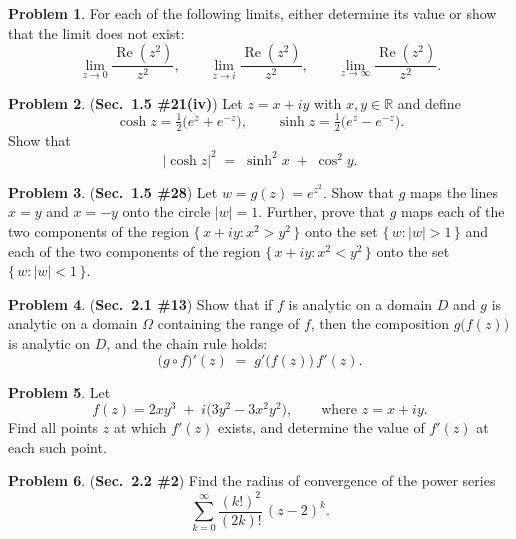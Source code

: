 \documentclass[10pt]{article}
\theoremstyle{definition} %
\newtheorem{problem}{Problem}
\theoremstyle{plain} %
\begin{document}
\begin{problem}
  For each of the following limits, either determine its value or show that the limit does not exist:
  \[
      \lim_{z \to 0}\frac{\operatorname{Re}(z^{2})}{z^{2}}, 
      \qquad 
      \lim_{z \to i}\frac{\operatorname{Re}(z^{2})}{z^{2}}, 
      \qquad 
      \lim_{z \to \infty}\frac{\operatorname{Re}(z^{2})}{z^{2}}.
  \]
\end{problem}

\begin{problem}
  (\textbf{Sec.\ 1.5 \#21(iv)})  
  Let \(z = x + iy\) with \(x,y \in \mathbb{R}\) and define
  \[
      \cosh z = \tfrac12\!\bigl(e^{z}+e^{-z}\bigr),
      \qquad
      \sinh z = \tfrac12\!\bigl(e^{z}-e^{-z}\bigr).
  \]
  Show that
  \[
      \lvert \cosh z \rvert^{2} \;=\; \sinh^{2}x \;+\; \cos^{2}y.
  \]
\end{problem}

\begin{problem}
  (\textbf{Sec.\ 1.5 \#28})  
  Let \(w = g(z) = e^{z^{2}}\).  
  Show that \(g\) maps the lines \(x = y\) and \(x = -y\) onto the circle \(\lvert w\rvert = 1\).  
  Further, prove that \(g\) maps each of the two components of the region
  \(\{\,x+iy : x^{2}>y^{2}\,\}\) onto the set \(\{\,w : \lvert w\rvert>1\,\}\)
  and each of the two components of the region
  \(\{\,x+iy : x^{2}<y^{2}\,\}\) onto the set \(\{\,w : \lvert w\rvert<1\,\}\).
\end{problem}
\begin{problem}
  (\textbf{Sec.\ 2.1 \#13})  
  Show that if \(f\) is analytic on a domain \(D\) and \(g\) is analytic on a domain \(\Omega\) containing the range of \(f\), then the composition \(g\!\bigl(f(z)\bigr)\) is analytic on \(D\), and the chain rule holds:
  \[
      \bigl(g\!\circ f\bigr)'(z) \;=\; g'\!\bigl(f(z)\bigr)\,f'(z).
  \]
\end{problem}

\begin{problem}
  Let
  \[
      f(z) = 2xy^{3} \;+\; i\!\bigl(3y^{2} - 3x^{2}y^{2}\bigr),
      \qquad\text{where } z = x + iy.
  \]
  Find all points \(z\) at which \(f'(z)\) exists, and determine the value of \(f'(z)\) at each such point.
\end{problem}

\begin{problem}
  (\textbf{Sec.\ 2.2 \#2})  
  Find the radius of convergence of the power series
  \[
      \sum_{k=0}^{\infty} \frac{(k!)^{2}}{(2k)!}\,(z-2)^{k}.
  \]
\end{problem}
\end{document}
